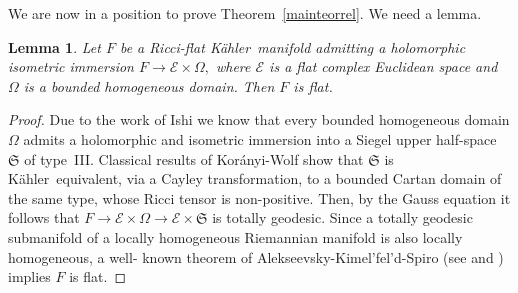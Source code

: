 \documentclass[reqno]{amsart}
\newcommand{\C}{\mathds{C}}
\newcommand{\K}{K\"{a}hler}
\newtheorem{lem}[theor]{Lemma}
\newtheorem{remark}{Remark}
\begin{document}
\medskip

We are now in a position to prove Theorem~\ref{mainteorrel}.  
We need a  lemma.



\begin{lem}\label{lemmaricciflat}
Let \(F\) be a Ricci-flat \K\ manifold admitting a holomorphic  isometric  immersion
$F \longrightarrow \mathcal E \times \Omega,$
where \(\mathcal E\) is a flat complex Euclidean space and \(\Omega\) is a bounded homogeneous domain.  
Then \(F\) is flat.
\end{lem}

\begin{proof}
Due  to the work of Ishi \cite[Th. 1]{Ishi24} we know that every bounded homogeneous domain \(\Omega\) admits a holomorphic and isometric immersion into a Siegel upper half-space \(\mathfrak S\) of type~III.  
Classical results of Kor\'anyi-Wolf \cite{KW65} show that \(\mathfrak S\) is \K\ equivalent, via a Cayley transformation, to a bounded Cartan domain of the same type, whose Ricci tensor is non-positive.  
Then, by the Gauss equation it follows that  $F\rightarrow \mathcal E \times \Omega\rightarrow 
 \mathcal E\times \mathfrak S$ is totally geodesic. 
Since a totally geodesic submanifold of a locally homogeneous Riemannian manifold is also locally homogeneous, a well- known theorem of Alekseevsky-Kimel’fel’d-Spiro (see \cite{AlekseevskyKimelfeld75} and \cite{Spiro93}) implies 
$F$ is flat.
\end{proof}

\end{document}
